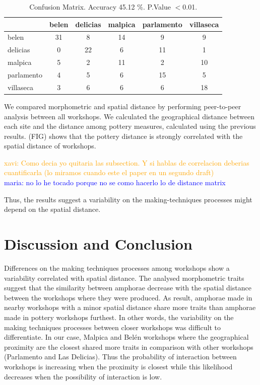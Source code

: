 \documentclass[review]{elsarticle}
\newcommand{\memo}[2]{\textcolor{#1}{#2}}
\newcommand{\xavi}[1]{\memo{orange}{xavi: #1\\}}
\newcommand{\maria}[1]{\memo{blue}{maria: #1\\}}
\begin{document}
\begin{table}[htp]
\begin{tabular}{lccccc}
\hline
 & belen & delicias & malpica & parlamento & villaseca\\ \hline
belen & 31 &       8 &      14 &          9 &          9 \\
delicias       & 0 &        22 &       6&         11&         1 \\
malpica &       5  &     2  &    11   &       2  &      10 \\
parlamento &     4  &      5 &      6 &        15 &        5\\
villaseca   &   3   &     6   &    6  &        6  &     18 \\
\hline

\end{tabular}
\caption{Confusion Matrix. Accuracy 45.12 $\%$. P.Value $<$0.01. }
\label{table:confusion}
\end{table}


We compared morphometric and spatial distance by performing peer-to-peer analysis between all workshops. We calculated the geographical distance between each site and the distance among pottery measures, calculated using the previous results. (FIG) shows that the pottery distance is strongly correlated with the spatial distance of workshops.


\xavi{Como decia yo quitaria las subsection. Y si hablas de correlacion deberias cuantificarla (lo miramos cuando este el paper en un segundo draft)}
\maria{no lo he tocado porque no se como hacerlo lo de distance matrix}



Thus, the results suggest a variability on the making-techniques processes might depend on the spatial distance.  

\section{Discussion and Conclusion}


Differences on the making techniques processes among workshops show a variability correlated with spatial distance. The analysed morphometric traits suggest that the similarity between amphorae decrease with the spatial distance between the workshops where they were produced. As result, amphorae made in nearby workshops with a minor spatial distance share more traits than amphorae made in pottery workshops furthest. In other words, the variability on the making techniques processes between closer workshops was difficult to differentiate. In our case, Malpica and Bel\'en workshops where the geographical proximity are the closest shared more traits in comparison with other workshops (Parlamento and Las Delicias). Thus the probability of interaction between workshops is increasing when the proximity is closest while this likelihood decreases when the possibility of interaction is low. 
\end{document}
